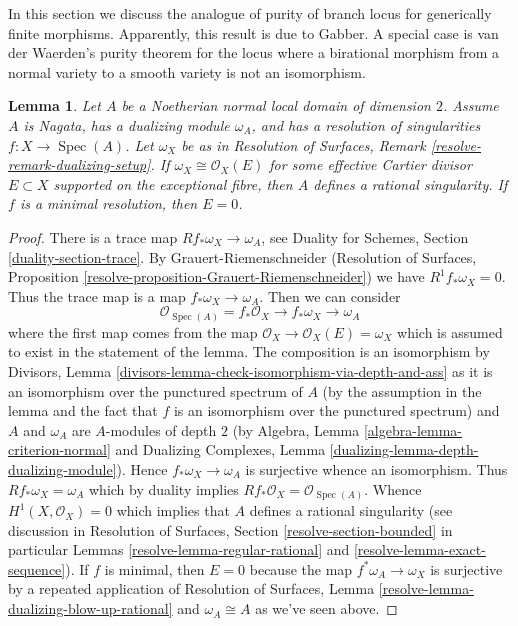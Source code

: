 \documentclass{stacks-project}
\theoremstyle{plain}
\newtheorem{lemma}[subsection]{Lemma}
\theoremstyle{definition}
\theoremstyle{remark}
\numberwithin{equation}{subsection}
\def\Spec{\mathop{\mathrm{Spec}}}
\begin{document}
\noindent
In this section we discuss the analogue of purity of branch locus for
generically finite morphisms. Apparently, this result is due to Gabber.
A special case is van der Waerden's purity theorem for the locus where
a birational morphism from a normal variety to a smooth variety is not
an isomorphism.

\begin{lemma}
\label{lemma-characterize-rational-singularity}
Let $A$ be a Noetherian normal local domain of dimension $2$.
Assume $A$ is Nagata, has a dualizing module $\omega_A$, and has a
resolution of singularities $f : X \to \Spec(A)$.
Let $\omega_X$ be as in Resolution of Surfaces,
Remark \ref{resolve-remark-dualizing-setup}.
If $\omega_X \cong \mathcal{O}_X(E)$ for some effective
Cartier divisor $E \subset X$ supported on the exceptional
fibre, then $A$ defines a rational singularity.
If $f$ is a minimal resolution, then $E = 0$.
\end{lemma}

\begin{proof}
There is a trace map $Rf_*\omega_X \to \omega_A$, see
Duality for Schemes, Section \ref{duality-section-trace}.
By Grauert-Riemenschneider
(Resolution of Surfaces,
Proposition \ref{resolve-proposition-Grauert-Riemenschneider})
we have $R^1f_*\omega_X = 0$.
Thus the trace map is a map $f_*\omega_X \to \omega_A$.
Then we can consider
$$
\mathcal{O}_{\Spec(A)} = f_*\mathcal{O}_X \to f_*\omega_X \to \omega_A
$$
where the first map comes from the map
$\mathcal{O}_X \to \mathcal{O}_X(E) = \omega_X$ which is
assumed to exist in the statement of the lemma.
The composition is an isomorphism by Divisors, Lemma
\ref{divisors-lemma-check-isomorphism-via-depth-and-ass}
as it is an isomorphism over the punctured spectrum of $A$
(by the assumption in the lemma and the fact that $f$ is an isomorphism
over the punctured spectrum) and $A$ and $\omega_A$
are $A$-modules of depth $2$ (by
Algebra, Lemma \ref{algebra-lemma-criterion-normal} and
Dualizing Complexes, Lemma \ref{dualizing-lemma-depth-dualizing-module}).
Hence $f_*\omega_X \to \omega_A$ is surjective whence an isomorphism.
Thus $Rf_*\omega_X = \omega_A$ which by duality implies
$Rf_*\mathcal{O}_X = \mathcal{O}_{\Spec(A)}$.
Whence $H^1(X, \mathcal{O}_X) = 0$ which implies that $A$
defines a rational singularity (see discussion in
Resolution of Surfaces, Section
\ref{resolve-section-bounded} in particular
Lemmas \ref{resolve-lemma-regular-rational} and
\ref{resolve-lemma-exact-sequence}).
If $f$ is minimal, then $E = 0$ because the map
$f^*\omega_A \to \omega_X$ is surjective by
a repeated application of Resolution of Surfaces, Lemma
\ref{resolve-lemma-dualizing-blow-up-rational}
and $\omega_A \cong A$ as we've seen above.
\end{proof}
\end{document}
